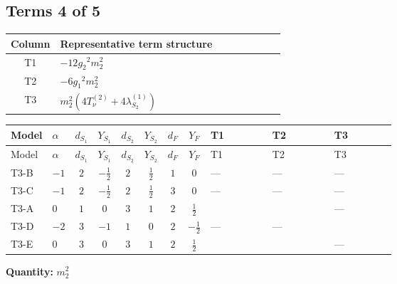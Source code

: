 \documentclass[8pt]{article}
\begin{document}
\begin{landscape}
\subsection*{Terms 4 of 5}
\begin{center}
\begin{tabular}{@{}c >{\raggedright\arraybackslash}p{0.82\linewidth}@{}}
\toprule
Column & Representative term structure \\
\midrule
T1 & \(\displaystyle -12 {g_2}^2 {m_2^2}\) \\
\midrule
T2 & \(\displaystyle -6 {g_1}^2 {m_2^2}\) \\
\midrule
T3 & \(\displaystyle {m_2^2} (4 T_{\nu}^{(2)}+4 {\lambda_{S_2}^{(1)}})\) \\
\midrule
\bottomrule
\end{tabular}
\end{center}
\smallskip
\tiny
\begin{longtable}{@{}llcccccc >{\raggedright\arraybackslash}p{0.21\linewidth} >{\raggedright\arraybackslash}p{0.21\linewidth} >{\raggedright\arraybackslash}p{0.21\linewidth}@{}}
\toprule
Model & $\alpha$ & $d_{S_1}$ & $Y_{S_1}$ & $d_{S_2}$ & $Y_{S_2}$ & $d_F$ & $Y_F$ & T1 & T2 & T3 \\
\midrule
\endfirsthead
\toprule
Model & $\alpha$ & $d_{S_1}$ & $Y_{S_1}$ & $d_{S_2}$ & $Y_{S_2}$ & $d_F$ & $Y_F$ & T1 & T2 & T3 \\
\midrule
\endhead
T3-B & $-1$ & $2$ & $-\frac{1}{2}$ & $2$ & $\frac{1}{2}$ & $1$ & $0$ & --- & --- & --- \\
\midrule
T3-C & $-1$ & $2$ & $-\frac{1}{2}$ & $2$ & $\frac{1}{2}$ & $3$ & $0$ & --- & --- & --- \\
\midrule
T3-A & $0$ & $1$ & $0$ & $3$ & $1$ & $2$ & $\frac{1}{2}$ & \scriptsize\adjustbox{max width=\linewidth}{$\begin{gathered} -12 {g_2}^2 {m_2^2}\end{gathered}$} & \scriptsize\adjustbox{max width=\linewidth}{$\begin{gathered} -6 {g_1}^2 {m_2^2}\end{gathered}$} & --- \\
\midrule
T3-D & $-2$ & $3$ & $-1$ & $1$ & $0$ & $2$ & $-\frac{1}{2}$ & --- & --- & \scriptsize\adjustbox{max width=\linewidth}{$\begin{gathered} {m_2^2} (4 T_{\nu}^{(2)}+4 {\lambda_{S_2}^{(1)}})\end{gathered}$} \\
\midrule
T3-E & $0$ & $3$ & $0$ & $3$ & $1$ & $2$ & $\frac{1}{2}$ & \scriptsize\adjustbox{max width=\linewidth}{$\begin{gathered} -12 {g_2}^2 {m_2^2}\end{gathered}$} & \scriptsize\adjustbox{max width=\linewidth}{$\begin{gathered} -6 {g_1}^2 {m_2^2}\end{gathered}$} & --- \\
\midrule
\bottomrule
\end{longtable}
\clearpage
\noindent\textbf{Quantity: }$m_2^2$\par\smallskip

\end{landscape}
\end{document}

